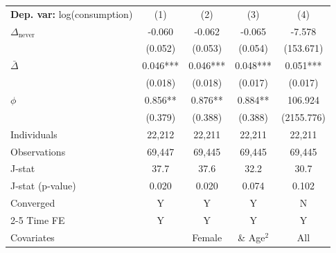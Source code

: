 \begin{tabular}{l cccc} \toprule  \textbf{Dep. var:}  log(consumption) 
                    &\multicolumn{1}{c}{(1)}   &\multicolumn{1}{c}{(2)}   &\multicolumn{1}{c}{(3)}   &\multicolumn{1}{c}{(4)}   \\

\addlinespace
$\Delta_{\text{never}}$&      -0.060   &      -0.062   &      -0.065   &      -7.578   \\
                    &     (0.052)   &     (0.053)   &     (0.054)   &   (153.671)   \\

\addlinespace
$\bar{\Delta}$      &       0.046***&       0.046***&       0.048***&       0.051***\\
                    &     (0.018)   &     (0.018)   &     (0.017)   &     (0.017)   \\

\addlinespace
$\phi$              &       0.856** &       0.876** &       0.884** &     106.924   \\
                    &     (0.379)   &     (0.388)   &     (0.388)   &  (2155.776)   \\
\addlinespace
Individuals         &      22,212   &      22,211   &      22,211   &      22,211   \\
Observations        &      69,447   &      69,445   &      69,445   &      69,445   \\
J-stat              &        37.7   &        37.6   &        32.2   &        30.7   \\
J-stat (p-value)    &       0.020   &       0.020   &       0.074   &       0.102   \\
Converged           &           Y   &           Y   &           Y   &           N   \\
\cmidrule{2-5} Time FE & Y & Y & Y & Y \\ Covariates & & Female & \& Age$^2$ & All \\ \bottomrule \end{tabular}
